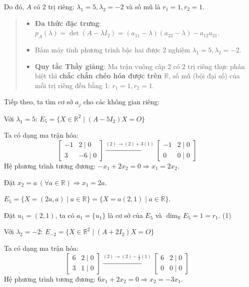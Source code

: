 \documentclass[12pt,a4paper]{article}
\newcommand{\R}{\mathbb{R}}
\begin{document}
Do đó, $A$ có 2 trị riêng: $\lambda_1 = 5, \lambda_2 = -2$ và số mũ là $r_1=1, r_2=1$.

\begin{quote}
\small
\noindent{}\par\vspace{3pt}
\begin{itemize}[noitemsep,topsep=2pt]
\item \textbf{Đa thức đặc trưng}: $p_A(\lambda) = \det(A - \lambda I_2) = (a_{11}-\lambda)(a_{22}-\lambda) - a_{12}a_{21}$.
\item Bấm máy tính phương trình bậc hai được 2 nghiệm $\lambda_1 = 5, \lambda_2 = -2$.
\item \textbf{Quy tắc Thầy giảng}: Ma trận vuông cấp 2 có 2 trị riêng thực phân biệt thì \textbf{chắc chắn chéo hóa được trên $\R$}, số mũ (bội đại số) của mỗi trị riêng đều bằng 1: $r_1 = 1, r_2 = 1$.
\end{itemize}
\end{quote}

\vspace{0.2cm}
Tiếp theo, ta tìm cơ sở $a_j$ cho các không gian riêng:

Với $\lambda_1 = 5$:
$E_5 = \{ X \in \R^2 \mid (A - 5I_2)X = O \}$

Ta có dạng ma trận hóa:
\[
\begin{bmatrix} -1 & 2 \mid 0 \\ 3 & -6 \mid 0 \end{bmatrix} \xrightarrow{(2) \to (2) + 3(1)} \begin{bmatrix} -1 & 2 \mid 0 \\ 0 & 0 \mid 0 \end{bmatrix}
\]
Hệ phương trình tương đương: $-x_1 + 2x_2 = 0 \Rightarrow x_1 = 2x_2$.

Đặt $x_2 = a \ (\forall a \in \R) \Rightarrow x_1 = 2a$.

$E_5 = \{ X = (2a, a) \mid a \in \R \} = \{ X = a(2, 1) \mid a \in \R \}$.

Đặt $u_1 = (2, 1)$, ta có $a_1 = \{u_1\}$ là cơ sở của $E_5$ và $\dim_{\R} E_5 = 1 = r_1$. \hfill (1)

Với $\lambda_2 = -2$:
$E_{-2} = \{ X \in \R^2 \mid (A + 2I_2)X = O \}$

Ta có dạng ma trận hóa:
\[
\begin{bmatrix} 6 & 2 \mid 0 \\ 3 & 1 \mid 0 \end{bmatrix} \xrightarrow{(2) \to (2) - \frac{1}{2}(1)} \begin{bmatrix} 6 & 2 \mid 0 \\ 0 & 0 \mid 0 \end{bmatrix}
\]
Hệ phương trình tương đương: $6x_1 + 2x_2 = 0 \Rightarrow x_2 = -3x_1$.
\end{document}
